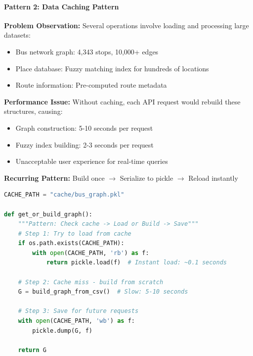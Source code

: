 \paragraph{Pattern 2: Data Caching Pattern} 
\textbf{Problem Observation:} Several operations involve loading and processing large datasets:
\begin{itemize}[noitemsep]
    \item Bus network graph: 4,343 stops, 10,000+ edges
    \item Place database: Fuzzy matching index for hundreds of locations
    \item Route information: Pre-computed route metadata
\end{itemize}

\textbf{Performance Issue:} Without caching, each API request would rebuild these structures, causing:
\begin{itemize}[noitemsep]
    \item Graph construction: 5-10 seconds per request
    \item Fuzzy index building: 2-3 seconds per request
    \item Unacceptable user experience for real-time queries
\end{itemize}

\textbf{Recurring Pattern:} Build once $\rightarrow$ Serialize to pickle $\rightarrow$ Reload instantly

\begin{lstlisting}[language=Python, caption={Caching Pattern Implementation in graph\_cache.py}]
CACHE_PATH = "cache/bus_graph.pkl"

def get_or_build_graph():
    """Pattern: Check cache -> Load or Build -> Save"""
    # Step 1: Try to load from cache
    if os.path.exists(CACHE_PATH):
        with open(CACHE_PATH, 'rb') as f:
            return pickle.load(f)  # Instant load: ~0.1 seconds
    
    # Step 2: Cache miss - build from scratch
    G = build_graph_from_csv()  # Slow: 5-10 seconds
    
    # Step 3: Save for future requests
    with open(CACHE_PATH, 'wb') as f:
        pickle.dump(G, f)
    
    return G
\end{lstlisting}


